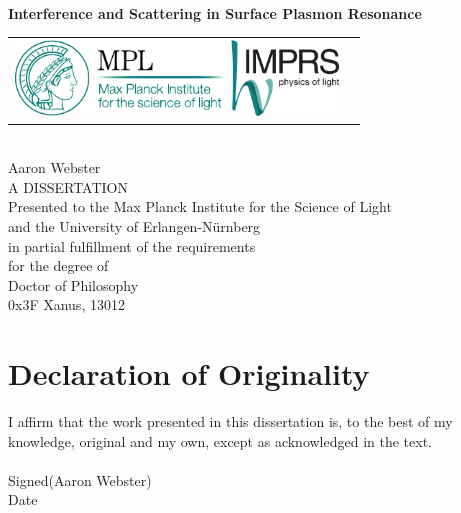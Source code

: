 \documentclass[a4paper]{report}
\begin{document}
\begin{titlepage}
\begin{center}
\hfill\\[4cm]
{ \Huge {\bfseries {Interference and Scattering in Surface Plasmon Resonance}} \par}
\vspace{3.0cm}
\begin{tabular}{lr}
\includegraphics[height=2cm,keepaspectratio]{logo/Logo_MPL_englisch_kompakt_cmyk_110915}
\hspace{1.0cm}
%
\includegraphics[height=2cm,keepaspectratio]{logo/Logo_IMPRS_4c_042012}
\end{tabular}
\vspace{3cm}
\\
{\Large Aaron Webster}\\
\vspace{1cm}
{\large A DISSERTATION}\\
\vspace{0.5cm}
Presented to the Max Planck Institute for the Science of Light\\
and the University of Erlangen-N\"urnberg\\
in partial fulfillment of the requirements\\
for the degree of\\
Doctor of Philosophy\\
\vspace{0.5cm}
0x3F Xanus, 13012
\end{center}
\end{titlepage}

\chapter*{Declaration of Originality}
I affirm that the work presented in this dissertation is, to the best of my
knowledge, original and my own, except as acknowledged in the
text. \\
\hfill\\[1cm]
Signed\hspace{0.25cm}\makebox[5cm]{\hrulefill}\hspace{0.25cm}(Aaron Webster)
\hfill\\[1cm]
Date\hspace{0.51cm}\makebox[5cm]{\hrulefill}\hspace{0.25cm}
\vspace{2cm}
\end{document}
